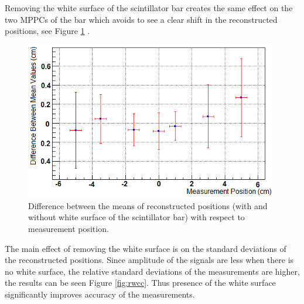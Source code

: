 \documentclass[a4paper]{article}\linespread{1.4}
\begin{document}
Removing the white surface of the scintillator bar creates the same effect on the two MPPCs of the bar which avoids to see a clear shift in the reconstructed positions, see Figure \ref{fig:rwc} .
\begin{figure}[] \centering \includegraphics[width=110mm,scale=1.0]{rwc.png} \caption{Difference between the means of reconstructed positions (with and without white surface of the scintillator bar) with respect to measurement position.} \label{fig:rwc} \end{figure}  
The main effect of removing the white surface is on the standard deviations of the reconstructed positions. Since amplitude of the signals are less when there is no white surface, the relative standard deviations of the measurements are higher, the results  can be seen Figure \ref{fig:rwcc}. Thus presence of the white surface significantly improves accuracy of the measurements.
\end{document}
